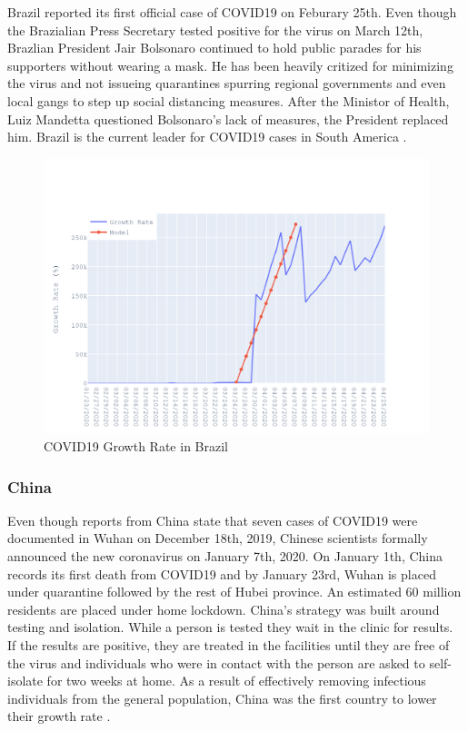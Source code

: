 \documentclass{homework}
\begin{document}
Brazil reported its first official case of COVID19 on Feburary 25th. Even though the Brazialian Press Secretary tested positive for the virus on March 12th, Brazlian President Jair Bolsonaro continued to hold public parades for his supporters without wearing a mask. He has been heavily critized for minimizing the virus and not issueing quarantines spurring regional governments and even local gangs to step up social distancing measures. After the Ministor of Health, Luiz Mandetta questioned Bolsonaro's lack of measures, the President replaced him. Brazil is the current leader for COVID19 cases in South America \cite{thebrazilianreport}.

\begin{figure}[H]
  \centering
  \includegraphics[scale=0.3]{task3/Brazil.png}
  \caption{COVID19 Growth Rate in Brazil}
\end{figure}

\newpage
\subsubsection{China}

Even though reports from China state that seven cases of COVID19 were documented in Wuhan on December 18th, 2019, Chinese scientists formally announced the new coronavirus on January 7th, 2020. On January 1th, China records its first death from COVID19 and by January 23rd, Wuhan is placed under quarantine followed by the rest of Hubei province. An estimated 60 million residents are placed under home lockdown. China's strategy was built around testing and isolation. While a person is tested they wait in the clinic for results. If the results are positive, they are treated in the facilities until they are free of the virus and individuals who were in contact with the person are asked to self-isolate for two weeks at home. As a result of effectively removing infectious individuals from the general population, China was the first country to lower their growth rate \cite{holly_secon_2020}.
\end{document}
